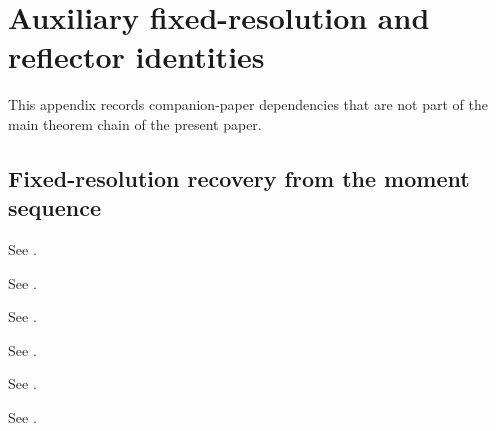 \section{Auxiliary fixed-resolution and reflector identities}
\label{app:auxiliary}

This appendix records companion-paper dependencies that are not part of the
main theorem chain of the present paper.

\subsection{Fixed-resolution recovery from the moment sequence}

\begin{theorem}
\label{thm:truncated-sum-curve}
See \cite[Theorem~\textup{``Truncated-sum curve and tail inversion''}]{MaZhangProjectionCore2026}.
\end{theorem}

\begin{theorem}
\label{thm:fiber-resolvent}
See \cite[Theorem~\textup{``Rational fiber-spectrum resolvent''}]{MaZhangProjectionCore2026}.
\end{theorem}

\begin{corollary}
\label{cor:stieltjes-log-derivative}
See \cite[Corollary~\textup{``Stieltjes logarithmic derivative''}]{MaZhangProjectionCore2026}.
\end{corollary}

\begin{theorem}
\label{thm:fiber-reconstruction}
See \cite[Theorem~\textup{``Exact finite reconstruction at fixed resolution''}]{MaZhangProjectionCore2026}.
\end{theorem}

\begin{theorem}
\label{thm:fiber-threshold-sharp}
See \cite[Theorem~\textup{``Sharpness of the \(2R\) threshold''}]{MaZhangProjectionCore2026}.
\end{theorem}

\begin{proposition}
\label{prop:hankel-realization}
See \cite[Proposition~\textup{``Minimal Hankel realization''}]{MaZhangProjectionCore2026}.
\end{proposition}

